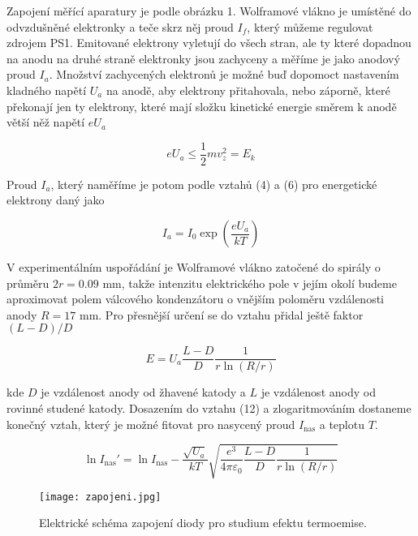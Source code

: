 \documentclass[a4paper,11pt]{article}
\begin{document}
Zapojení měřící aparatury je podle obrázku 1. Wolframové vlákno je umístěné do odvzdušněné elektronky a teče skrz něj proud $ I_f $, který můžeme regulovat zdrojem PS1. Emitované elektrony vyletují do všech stran, ale ty které dopadnou na anodu na druhé straně elektronky jsou zachyceny a měříme je jako anodový proud $ I_a $. Množství zachycených elektronů je možné buď dopomoct nastavením kladného napětí $ U_a $  na anodě, aby elektrony přitahovala, nebo záporně, které překonají jen ty elektrony, které mají složku kinetické energie směrem k anodě větší něž napětí $ e U_a $ 

\begin{equation}
e U_a \le  \frac{1}{2}m v_z^2  = E_k
\end{equation}

\noindent
Proud $ I_a $, který naměříme je potom podle vztahů (4) a (6) pro energetické elektrony daný jako

\begin{equation}
I_a = I_0 \exp \left( {\frac{e U_a}{kT}} \right)
\end{equation}

V experimentálním uspořádání je Wolframové vlákno zatočené do spirály o průměru $  2r = 0.09 $ mm, takže intenzitu elektrického pole v jejím okolí budeme aproximovat polem válcového kondenzátoru o vnějším poloměru vzdálenosti anody $ R = 17 $ mm. Pro přesnější určení se do vztahu přidal ještě faktor $ (L - D) / D $

\begin{equation}
E = U_a \frac{L - D}{D} \frac{1}{r \ln (R / r )}
\end{equation}

\noindent
kde $ D $  je vzdálenost anody od žhavené katody a $ L $  je vzdálenost anody od rovinné studené katody. Dosazením do vztahu (12) a zlogaritmováním dostaneme konečný vztah, který je možné fitovat pro nasycený proud $ I_{\text{nas}} $  a teplotu $ T $.

\begin{equation}
    \ln I_{\text{nas}}' = \ln I_{\text{nas}} -  \frac{ \sqrt{U_a} }{kT} \sqrt{ \frac{e^{3} }{4 \pi \varepsilon_0} \frac{L - D}{D} \frac{1}{r \ln (R / r )} } 
\end{equation}

\begin{figure}[htpb]
    \centering
    \texttt{[image: zapojeni.jpg]}
    \caption{Elektrické schéma zapojení diody pro studium efektu termoemise.}
\end{figure}
\end{document}

